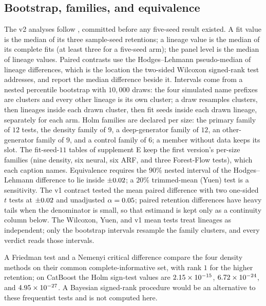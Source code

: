 \documentclass{article}
\begin{document}
\subsection{Bootstrap, families, and equivalence}

The v2 analyses follow , committed before any five-seed result existed. A fit value is the median of its three sample-seed retentions; a lineage value is the median of its complete fits (at least three for a five-seed arm); the panel level is the median of lineage values. Paired contrasts use the Hodges--Lehmann pseudo-median of lineage differences, which is the location the two-sided Wilcoxon signed-rank test addresses, and report the median difference beside it. Intervals come from a nested percentile bootstrap with $10{,}000$ draws: the four simulated name prefixes are clusters and every other lineage is its own cluster; a draw resamples clusters, then lineages inside each drawn cluster, then fit seeds inside each drawn lineage, separately for each arm. Holm families are declared per size: the primary family of $12$ tests, the density family of $9$, a deep-generator family of $12$, an other-generator family of $9$, and a control family of $6$; a member without data keeps its slot. The fit-seed-$11$ tables of supplement E keep the first version's per-size families (nine density, six neural, six ARF, and three Forest-Flow tests), which each caption names. Equivalence requires the $90\%$ nested interval of the Hodges--Lehmann difference to lie inside $\pm0.02$; a $20\%$ trimmed-mean (Yuen) test is a sensitivity. The v1 contract tested the mean paired difference with two one-sided $t$ tests at $\pm0.02$ and unadjusted $\alpha=0.05$; paired retention differences have heavy tails when the denominator is small, so that estimand is kept only as a continuity column below. The Wilcoxon, Yuen, and v1 mean tests treat lineages as independent; only the bootstrap intervals resample the family clusters, and every verdict reads those intervals.

A Friedman test and a Nemenyi critical difference compare the four density methods on their common complete-informative set, with rank $1$ for the higher retention; on CatBoost the Holm sign-test values are $2.15\times 10^{-15}$, $6.72\times 10^{-24}$, and $4.95\times 10^{-27}$. A Bayesian signed-rank procedure would be an alternative to these frequentist tests and is not computed here.
\end{document}
